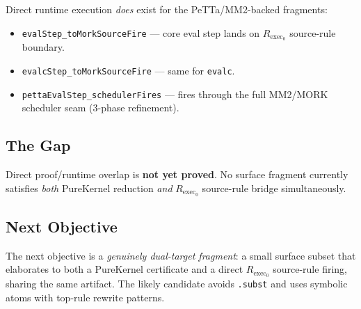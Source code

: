 \documentclass[11pt]{article}
\theoremstyle{remark}
\newcommand{\MORK}{\textup{MORK}}
\newcommand{\PeTTa}{\textup{PeTTa}}
\newcommand{\code}[1]{\texttt{#1}}
\newcommand{\leanref}[1]{\texttt{#1}}
\begin{document}
Direct runtime execution \emph{does} exist for the \PeTTa{}/MM2-backed
fragments:

\begin{itemize}[nosep]
  \item \leanref{evalStep\_toMorkSourceFire} --- core eval step lands on
  $R_{\mathrm{exec}_0}$ source-rule boundary.
  \item \leanref{evalcStep\_toMorkSourceFire} --- same for \code{evalc}.
  \item \leanref{pettaEvalStep\_schedulerFires} --- fires through the
  full MM2/\MORK{} scheduler seam (3-phase refinement).
\end{itemize}

\subsection{The Gap}

Direct proof/runtime overlap is \textbf{not yet proved}. No surface
fragment currently satisfies \emph{both} PureKernel reduction \emph{and}
$R_{\mathrm{exec}_0}$ source-rule bridge simultaneously.

\begin{center}
\end{center}

\subsection{Next Objective}

The next objective is a \emph{genuinely dual-target fragment}: a small
surface subset that elaborates to both a PureKernel certificate and a
direct $R_{\mathrm{exec}_0}$ source-rule firing, sharing the same artifact.
The likely candidate avoids \code{.subst} and uses symbolic atoms with
top-rule rewrite patterns.
\end{document}
